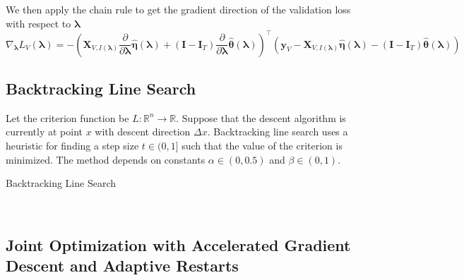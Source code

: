 \documentclass[10pt,letterpaper]{article}
\begin{document}
We then apply the chain rule to get the gradient direction of the validation loss with respect to $\boldsymbol \lambda$
\begin{equation}
\nabla_{\boldsymbol{\lambda}} L_V(\boldsymbol{\lambda}) =
- \left(
\boldsymbol{X}_{V, I(\boldsymbol\lambda)} \frac{\partial}{\partial \boldsymbol{\lambda}}\hat{\boldsymbol\eta}(\boldsymbol{\lambda})
+ (\boldsymbol I - \boldsymbol{I}_T) \frac{\partial}{\partial \boldsymbol{\lambda}}\hat{\boldsymbol\theta}(\boldsymbol{\lambda})
\right )^\top
\left (
\boldsymbol{y}_V
- \boldsymbol{X}_{V, I(\boldsymbol\lambda)} \hat{\boldsymbol\eta}(\boldsymbol{\lambda})
- (\boldsymbol I - \boldsymbol{I}_T) \hat{\boldsymbol\theta}(\boldsymbol{\lambda})
\right )
\end{equation}


\subsection{Backtracking Line Search}

Let the criterion function be $L:\mathbb{R}^n \rightarrow \mathbb{R}$. Suppose that the descent algorithm is currently at point $x$ with descent direction $\Delta x$. Backtracking line search uses a heuristic for finding a step size $t \in (0,1]$ such that the value of the criterion is minimized. The method depends on constants $\alpha  \in (0, 0.5)$ and $\beta \in (0,1)$.

\begin{algorithm}
\caption{Backtracking Line Search}
\label{alg:backtracking}
         \begin{algorithmic}
  	 \\
	\ENDWHILE
	\end{algorithmic}
\end{algorithm}

\subsection{Joint Optimization with Accelerated Gradient Descent and Adaptive Restarts}
\end{document}
